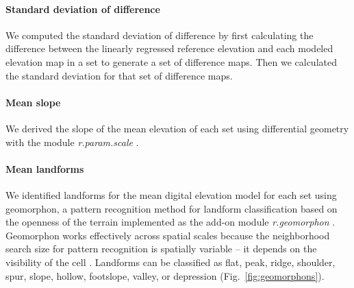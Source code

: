 \documentclass[prodmode,acmtochi]{acmsmall} %
\begin{document}
\paragraph{Standard deviation of difference}

We computed the standard deviation of difference
by first calculating the difference 
between the linearly regressed reference elevation and 
each modeled elevation map in a set
to generate a set of difference maps.
Then we calculated the standard deviation 
for that set of difference maps. 

%
%
%
%
%
%
%

\paragraph{Mean slope}
We derived the slope of the mean elevation of each set %
using differential geometry
\cite{Wood1996} 
with the module \textit{r.param.scale} \cite{r.param.scale}.

\paragraph{Mean landforms}
We identified landforms 
for the mean digital elevation model for each set 
using geomorphon,
a pattern recognition method for landform classification 
based on the openness of the terrain
implemented as the add-on module \textit{r.geomorphon} \cite{r.geomorphon}.
Geomorphon works effectively across spatial scales because 
the neighborhood search size for pattern recognition 
is spatially variable -- it depends on the visibility of the cell \cite{Jasiewicz2013}.  
Landforms can be classified as flat, peak, ridge, shoulder, spur, slope, hollow, footslope, valley, or depression (Fig.~\ref{fig:geomorphons}).
\end{document}

